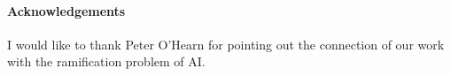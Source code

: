 \paragraph{Acknowledgements}

I would like to thank Peter O'Hearn for pointing out the connection
of our work with the ramification problem of AI.


% 
% 
% 
% 
% 
